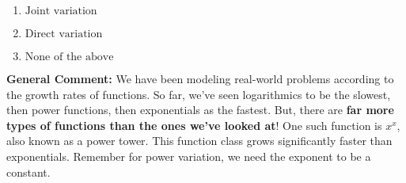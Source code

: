 \documentclass{extbook}[14pt]
\begin{document}
\begin{enumerate}
{\begin{enumerate}[label=\Alph*.]
\item \( \text{Joint variation} \)


\item \( \text{Direct variation} \)


\item \( \text{None of the above} \)


\end{enumerate}

\textbf{General Comment:} We have been modeling real-world problems according to the growth rates of functions. So far, we've seen logarithmics to be the slowest, then power functions, then exponentials as the fastest. But, there are \textbf{far more types of functions than the ones we've looked at}! One such function is $x^x$, also known as a power tower. This function class grows significantly faster than exponentials. Remember for power variation, we need the exponent to be a constant.
}
\end{enumerate}
\end{document}
